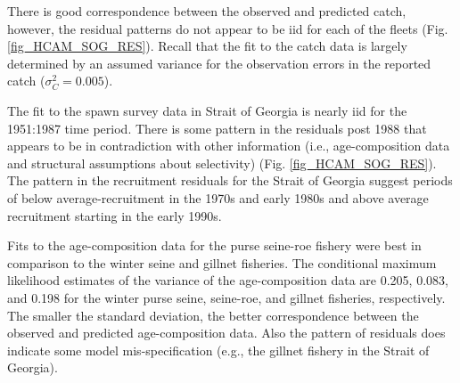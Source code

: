 There is good correspondence between the observed and predicted catch, however, the residual patterns do not appear to be iid for each of the fleets (Fig. \ref{fig_HCAM_SOG_RES}).  Recall that the fit to the catch data is largely determined by an assumed variance for the observation errors in the reported catch ($\sigma_C^2=0.005$).   

The fit to the spawn survey data in Strait of Georgia is nearly iid for the 1951:1987 time period.  There is some pattern in the residuals post 1988 that appears to be in contradiction with other information (i.e., age-composition data and structural assumptions about selectivity) (Fig. \ref{fig_HCAM_SOG_RES}).  The pattern in the recruitment residuals for the Strait of Georgia suggest periods of below average-recruitment in the 1970s and early 1980s and above average recruitment starting in the early 1990s.


Fits to the age-composition data for the purse seine-roe fishery were best in comparison to the winter seine and gillnet fisheries.   The conditional maximum likelihood estimates of the variance of the age-composition data are 0.205, 0.083, and 0.198 for the winter purse seine, seine-roe, and gillnet fisheries, respectively.  The smaller the standard deviation, the better correspondence between the observed and predicted age-composition data.  Also the pattern of residuals does indicate some model mis-specification (e.g., the gillnet fishery in the Strait of Georgia).






